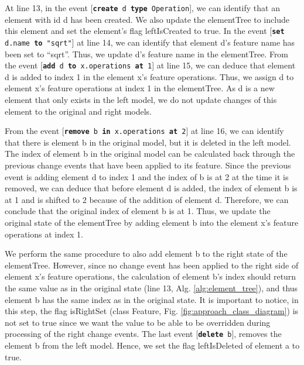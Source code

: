 \documentclass{jot}
\begin{document}
    At line 13, in the event [\texttt{\small \textbf{create} d \textbf{type} Operation}], we can identify that an element with id \textsf{d} has been created. We also update the \textsf{elementTree} to include this element and set the element's flag \textsf{leftIsCreated} to \textsf{true}. In the event [\texttt{\small \textbf{set} d.name \textbf{to} "sqrt"}] at line 14, we can identify that element \textsf{d}'s feature \textsf{name} has been set to ``sqrt''. Thus, we update \textsf{d}'s feature \textsf{name} in the \textsf{elementTree}. From the event [\texttt{\small \textbf{add} d \textbf{to} x.operations \textbf{at} 1}] at line 15, we can deduce that element \textsf{d} is added to index 1 in the element \textsf{x}'s feature \textsf{operations}. Thus, we assign \textsf{d} to element \textsf{x}'s feature \textsf{operations} at index 1 in the \textsf{elementTree}. As \textsf{d} is a new element that only exists in the left model, we do not update changes of this element to the original and right models. 
    
    From the event [\texttt{\small \textbf{remove} b \textbf{in} x.operations \textbf{at} 2}] at line 16, we can identify that there is element \textsf{b} in the original model, but it is deleted in the left model. The index of element \textsf{b} in the original model can be calculated back through the previous change events that have been applied to its feature. Since the previous event is adding element \textsf{d} to index 1 and the index of \textsf{b} is at 2 at the time it is removed, we can deduce that before element \textsf{d} is added, the index of element \textsf{b} is at 1 and is shifted to 2 because of the addition of element \textsf{d}.  Therefore, we can conclude that the original index of element \textsf{b} is at 1. Thus, we update the original state of the \textsf{elementTree} by adding element \textsf{b} into the element \textsf{x}'s feature \textsf{operations} at index 1.  
    
    We perform the same procedure to also add element \textsf{b} to the right state of the \textsf{elementTree}. However, since no change event has been applied to the right side of element \textsf{x}'s feature \textsf{operations}, the calculation of element \textsf{b}'s index should return the same value as in the original state (line 13, Alg. \ref{alg:element_tree}), and thus element \textsf{b} has the same index as in the original state. It is important to notice, in this step, the flag \textsf{isRightSet} (class \textsf{Feature}, Fig. \ref{fig:approach_class_diagram}) is not set to \textsf{true} since we want the value to be able to be overridden during processing of the right change events. The last event [\texttt{\small \textbf{delete} b}], removes the element \textsf{b} from the left model. Hence, we set the flag \textsf{leftIsDeleted} of element \textsf{a} to \textsf{true}.
    
\end{document}
